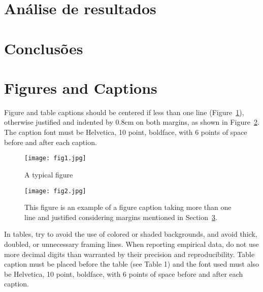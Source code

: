 \documentclass[12pt]{article}
\begin{document}
\section{Análise de resultados} \label{sec:results}


\section{Conclusões}




\section{Figures and Captions}\label{sec:figs}

Figure and table captions should be centered if less than one line
(Figure~\ref{fig:exampleFig1}), otherwise justified and indented by 0.8cm on
both margins, as shown in Figure~\ref{fig:exampleFig2}. The caption font must
be Helvetica, 10 point, boldface, with 6 points of space before and after each
caption.

\begin{figure}[ht]
\centering
\texttt{[image: fig1.jpg]}
\caption{A typical figure}
\label{fig:exampleFig1}
\end{figure}

\begin{figure}[ht]
\centering
\texttt{[image: fig2.jpg]}
\caption{This figure is an example of a figure caption taking more than one
  line and justified considering margins mentioned in Section~\ref{sec:figs}.}
\label{fig:exampleFig2}
\end{figure}

In tables, try to avoid the use of colored or shaded backgrounds, and avoid
thick, doubled, or unnecessary framing lines. When reporting empirical data,
do not use more decimal digits than warranted by their precision and
reproducibility. Table caption must be placed before the table (see Table 1)
and the font used must also be Helvetica, 10 point, boldface, with 6 points of
space before and after each caption.
\end{document}
